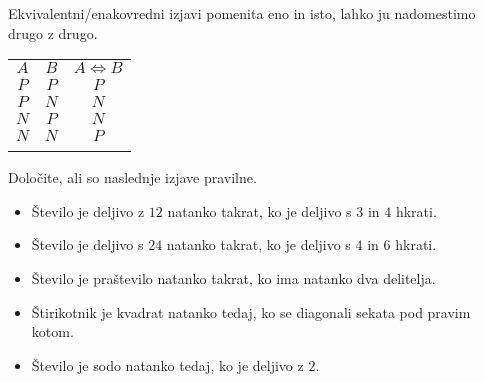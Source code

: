                       
                        Ekvivalentni/enakovredni izjavi pomenita eno in isto, lahko ju nadomestimo 
                        drugo z drugo.
                     

                    \begin{table}[H]
                        \centering
                        \begin{tabular}{||c|c|c||} 
                        \hhline{|t:===:t|}
                        \rowcolor[rgb]{0.843,0.718,0.718} $A$ & $B$ & $A\Leftrightarrow B$  \\ 
                        \hhline{|:===:|}
                        $P$ & $P$ & $P$                         \\ 
                        \hline
                        $P$ & $N$ & $N$                         \\ 
                        \hline
                        $N$ & $P$ & $N$                         \\ 
                        \hline
                        $N$ & $N$ & $P$                         \\
                        \hhline{|b:===:b|}
                        \end{tabular}
                    \end{table}

         

         
             \begin{naloga}
                Določite, ali so naslednje izjave pravilne.
                \begin{itemize}
                    \item Število je deljivo z $12$ natanko takrat, ko je deljivo s $3$ in $4$ hkrati.
                    \item Število je deljivo s $24$ natanko takrat, ko je deljivo s $4$ in $6$ hkrati.
                    \item Število je praštevilo natanko takrat, ko ima natanko dva delitelja.
                    \item Štirikotnik je kvadrat natanko tedaj, ko se diagonali sekata pod pravim kotom.
                    \item Število je sodo natanko tedaj, ko je deljivo z $2$.
                \end{itemize}
            \end{naloga}
         

